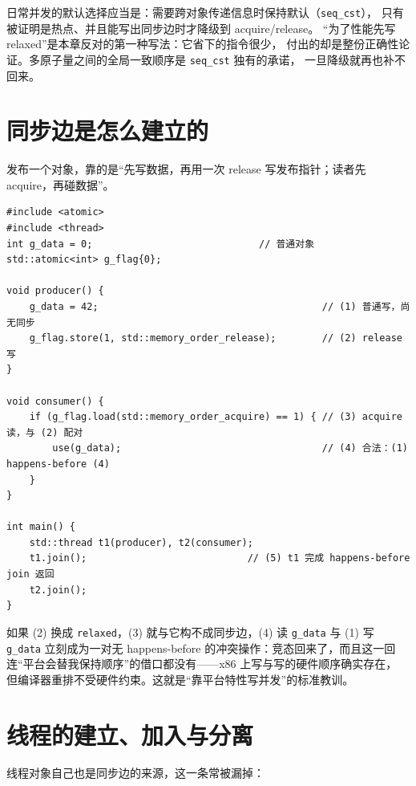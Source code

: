 \documentclass[12pt,a4paper,fontset=fandol]{ctexbook}
\newcommand{\Tp}[1]{\texttt{#1}}
\begin{document}
日常并发的默认选择应当是：需要跨对象传递信息时保持默认（\Tp{seq\_cst}），
只有被证明是热点、并且能写出同步边时才降级到 acquire/release。
“为了性能先写 relaxed”是本章反对的第一种写法：它省下的指令很少，
付出的却是整份正确性论证。多原子量之间的全局一致顺序是 \Tp{seq\_cst} 独有的承诺，
一旦降级就再也补不回来。

\section{同步边是怎么建立的}\label{sec:ub10-publication}

发布一个对象，靠的是“先写数据，再用一次 release 写发布指针；读者先 acquire，再碰数据”。

\begin{lstlisting}[style=cppstyle, caption={acquire/release 配对：普通数据的合法发布}]
#include <atomic>
#include <thread>
int g_data = 0;                             // 普通对象
std::atomic<int> g_flag{0};

void producer() {
    g_data = 42;                                       // (1) 普通写，尚无同步
    g_flag.store(1, std::memory_order_release);        // (2) release 写
}

void consumer() {
    if (g_flag.load(std::memory_order_acquire) == 1) { // (3) acquire 读，与 (2) 配对
        use(g_data);                                   // (4) 合法：(1) happens-before (4)
    }
}

int main() {
    std::thread t1(producer), t2(consumer);
    t1.join();                            // (5) t1 完成 happens-before join 返回
    t2.join();
}
\end{lstlisting}

如果 (2) 换成 \Tp{relaxed}，(3) 就与它构不成同步边，(4) 读 \Tp{g\_data} 与 (1) 写
\Tp{g\_data} 立刻成为一对无 happens-before 的冲突操作：竞态回来了，而且这一回
连“平台会替我保持顺序”的借口都没有——x86 上写与写的硬件顺序确实存在，
但编译器重排不受硬件约束。这就是“靠平台特性写并发”的标准教训。

\section{线程的建立、加入与分离}\label{sec:ub10-thread}

线程对象自己也是同步边的来源，这一条常被漏掉：
\end{document}

